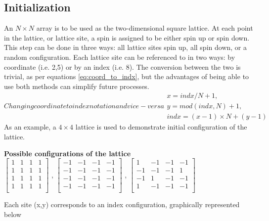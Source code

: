\documentclass[letterpaper,12pt]{article}
\numberwithin{equation}{subsection}
\begin{document}
\subsection{Initialization}
An $N \times N$ array is to be used as the two-dimensional square lattice. At each point in the lattice, or lattice site, a spin is assigned to be either spin up or spin down. This step can be done in three ways: all lattice sites spin up, all spin down, or a random configuration. Each lattice site can be referenced to in two ways: by coordinate (i.e. 2,5) or by an index (i.e. 8). The conversion between the two is trivial, as per equations \eqref{eq:coord_to_indx}, but the advantages of being able to use both methods can simplify future processes. \\
\begin{subequations}
Changing coordinate to index notation and vice-versa
\label{eq:coord_to_indx}
\begin{align}
x = indx/N+1, \\
y = mod(indx,N)+1, \\
indx = (x-1) \times N+(y-1)
\end{align}
\end{subequations}
As an example, a $4 \times 4$ lattice is used to demonstrate initial configuration of the lattice.
\begin{center}
\textbf{Possible configurations of the lattice} \\
$ \begin{bmatrix}
1 & 1 & 1 & 1 \\
1 & 1 & 1 & 1 \\
1 & 1 & 1 & 1 \\
1 & 1 & 1 & 1 \\
\end{bmatrix}$ , 
$ \begin{bmatrix}
-1 & -1 & -1 & -1 \\
-1 & -1 & -1 & -1 \\
-1 & -1 & -1 & -1 \\
-1 & -1 & -1 & -1 \\
\end{bmatrix}$ , 
$ \begin{bmatrix}
1 & -1 & -1 & -1 \\
-1 & -1 & -1 & 1 \\
-1 & 1 & -1 & -1 \\
1 & -1 & -1 & -1 \\
\end{bmatrix}$
\end{center}
Each site (x,y) corresponds to an index configuration, graphically represented below
\end{document}
